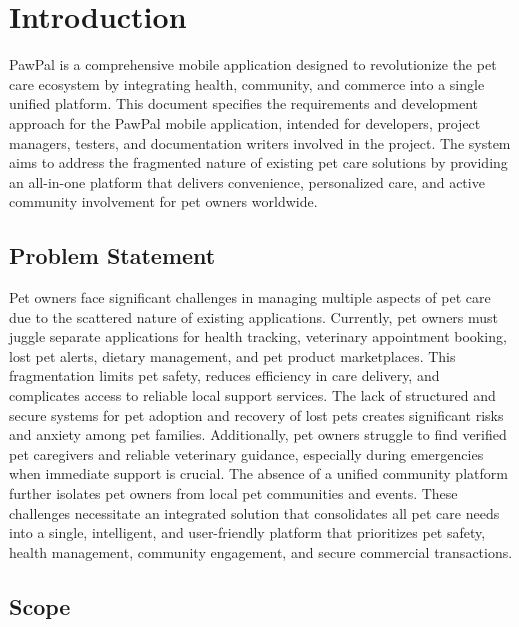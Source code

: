 \chapter{Introduction}
\label{sec:introduction}

PawPal is a comprehensive mobile application designed to revolutionize the pet care ecosystem by integrating health, community, and commerce into a single unified platform. This document specifies the requirements and development approach for the PawPal mobile application, intended for developers, project managers, testers, and documentation writers involved in the project. The system aims to address the fragmented nature of existing pet care solutions by providing an all-in-one platform that delivers convenience, personalized care, and active community involvement for pet owners worldwide.

\section{Problem Statement}

Pet owners face significant challenges in managing multiple aspects of pet care due to the scattered nature of existing applications. Currently, pet owners must juggle separate applications for health tracking, veterinary appointment booking, lost pet alerts, dietary management, and pet product marketplaces. This fragmentation limits pet safety, reduces efficiency in care delivery, and complicates access to reliable local support services. The lack of structured and secure systems for pet adoption and recovery of lost pets creates significant risks and anxiety among pet families. Additionally, pet owners struggle to find verified pet caregivers and reliable veterinary guidance, especially during emergencies when immediate support is crucial. The absence of a unified community platform further isolates pet owners from local pet communities and events. These challenges necessitate an integrated solution that consolidates all pet care needs into a single, intelligent, and user-friendly platform that prioritizes pet safety, health management, community engagement, and secure commercial transactions.

\section{Scope}

